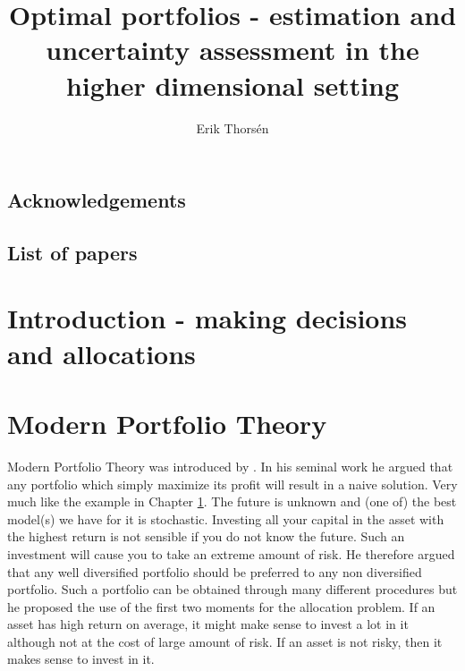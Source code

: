 \documentclass[]{book}\usepackage{knitr}
\title{Optimal portfolios - estimation and uncertainty assessment in the higher dimensional setting}
\author{Erik Thorsén}
\begin{document}


\maketitle

\section*{Acknowledgements}

\newpage
\section*{List of papers}



\tableofcontents
\chapter[Introduction]{Introduction - making decisions and allocations}\label{ch:intro}

\chapter{Modern Portfolio Theory}\label{ch:MPT}


Modern Portfolio Theory was introduced by \cite{markowitz1959portfolio}. 
In his seminal work he argued that any portfolio which simply maximize its profit will result in a naive solution.
Very much like the example in Chapter \ref{ch:intro}. 
The future is unknown and (one of) the best model(s) we have for it is stochastic.
Investing all your capital in the asset with the highest return is not sensible if you do not know the future.
Such an investment will cause you to take an extreme amount of risk. 
He therefore argued that any well diversified portfolio should be preferred to any non diversified portfolio. 
Such a portfolio can be obtained through many different procedures but he proposed the use of the first two moments for the allocation problem.
If an asset has high return on average, it might make sense to invest a lot in it although not at the cost of large amount of risk. If an asset is not risky, then it makes sense to invest in it.
\end{document}
